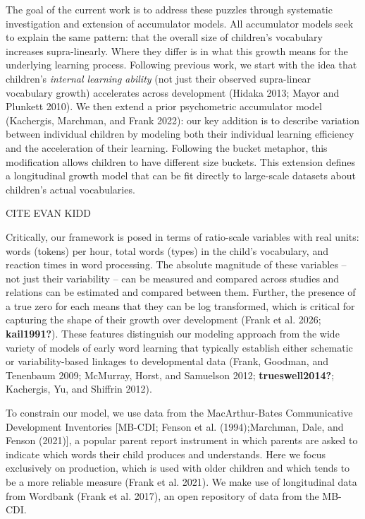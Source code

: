 \documentclass[
  11pt,
]{article}
\begin{document}
The goal of the current work is to address these puzzles through
systematic investigation and extension of accumulator models. All
accumulator models seek to explain the same pattern: that the overall
size of children's vocabulary increases supra-linearly. Where they
differ is in what this growth means for the underlying learning process.
Following previous work, we start with the idea that children's
\emph{internal learning ability} (not just their observed supra-linear
vocabulary growth) accelerates across development (Hidaka 2013; Mayor
and Plunkett 2010). We then extend a prior psychometric accumulator
model (Kachergis, Marchman, and Frank 2022): our key addition is to
describe variation between individual children by modeling both their
individual learning efficiency and the acceleration of their learning.
Following the bucket metaphor, this modification allows children to have
different size buckets. This extension defines a longitudinal growth
model that can be fit directly to large-scale datasets about children's
actual vocabularies.

CITE EVAN KIDD

Critically, our framework is posed in terms of ratio-scale variables
with real units: words (tokens) per hour, total words (types) in the
child's vocabulary, and reaction times in word processing. The absolute
magnitude of these variables -- not just their variability -- can be
measured and compared across studies and relations can be estimated and
compared between them. Further, the presence of a true zero for each
means that they can be log transformed, which is critical for capturing
the shape of their growth over development (Frank et al. 2026;
\textbf{kail1991?}). These features distinguish our modeling approach
from the wide variety of models of early word learning that typically
establish either schematic or variability-based linkages to
developmental data (Frank, Goodman, and Tenenbaum 2009; McMurray, Horst,
and Samuelson 2012; \textbf{trueswell2014?}; Kachergis, Yu, and Shiffrin
2012).

To constrain our model, we use data from the MacArthur-Bates
Communicative Development Inventories {[}MB-CDI; Fenson et al.
(1994);Marchman, Dale, and Fenson (2021){]}, a popular parent report
instrument in which parents are asked to indicate which words their
child produces and understands. Here we focus exclusively on production,
which is used with older children and which tends to be a more reliable
measure (Frank et al. 2021). We make use of longitudinal data from
Wordbank (Frank et al. 2017), an open repository of data from the
MB-CDI.
\end{document}
